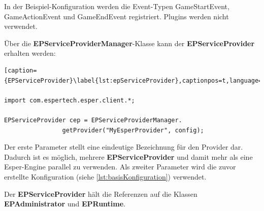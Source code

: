 In der Beispiel-Konfiguration werden die Event-Typen GameStartEvent, GameActionEvent und GameEndEvent registriert. Plugins werden nicht verwendet.

Über die \textbf{EPServiceProviderManager}-Klasse kann der \textbf{EPServiceProvider} erhalten werden:
 
\begin{lstlisting}[caption={EPServiceProvider}\label{lst:epServiceProvider},captionpos=t,language=JAVA]

import com.espertech.esper.client.*;

EPServiceProvider cep = EPServiceProviderManager.
				getProvider("MyEsperProvider", config);
\end{lstlisting}
 
 
Der erste Parameter stellt eine eindeutige Bezeichnung für den Provider dar. Dadurch ist es möglich, mehrere \textbf{EPServiceProvider} und damit mehr als eine Esper-Engine parallel zu verwenden. Als zweiter Parameter wird die zuvor  erstellte Konfiguration (siehe \ref{lst:basisKonfiguration}) verwendet.

Der \textbf{EPServiceProvider} hält die Referenzen auf die Klassen \textbf{EPAdministrator} und \textbf{EPRuntime}. 